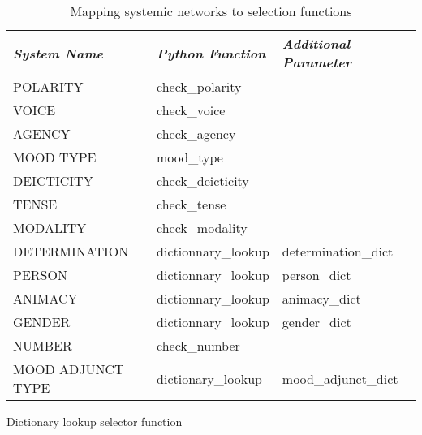\begin{table}[H]
\centering
\begin{tabulary}{\textwidth}{|L|L|L|}
\hline
\textit{System Name} & \textit{Python Function}   & \textit{Additional Parameter} \\ \hline
POLARITY             & check\_polarity     &                               \\ \hline
VOICE                & check\_voice        &                               \\ \hline
AGENCY               & check\_agency       &                               \\ \hline
MOOD TYPE            & mood\_type          &                               \\ \hline
DEICTICITY           & check\_deicticity   &                               \\ \hline
TENSE                & check\_tense        &                               \\ \hline
MODALITY             & check\_modality     &                               \\ \hline
DETERMINATION        & dictionnary\_lookup & determination\_dict           \\ \hline
PERSON               & dictionnary\_lookup & person\_dict                  \\ \hline
ANIMACY              & dictionnary\_lookup & animacy\_dict                 \\ \hline
GENDER               & dictionnary\_lookup & gender\_dict                  \\ \hline
NUMBER               & check\_number       &                               \\ \hline
MOOD ADJUNCT TYPE    & dictionary\_lookup & mood\_adjunct\_dict           \\ \hline
\end{tabulary}
\caption{Mapping systemic networks to selection functions}
\label{tab:system-to-function-mapping}
\end{table}


\begin{algorithm}[!ht]
	\Input {\cg, \dg}
	\caption{Dictionary lookup selector function}
	\label{alg:dictionary-loockup}
\end{algorithm}

